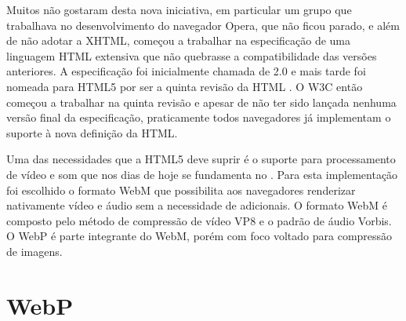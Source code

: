 \documentclass[espaco=simples,appendix=Name]{abnt}
\begin{document}
\begin{description}
Muitos não gostaram desta nova iniciativa, em particular um grupo que trabalhava no desenvolvimento do navegador Opera, que não ficou parado, e além de não adotar a XHTML, começou a trabalhar na especificação de uma linguagem HTML extensiva que não quebrasse a compatibilidade das versões anteriores.  A especificação foi inicialmente chamada de  2.0 e mais tarde foi nomeada para HTML5 por ser a quinta revisão da HTML \cite{HTML5Intro}. O W3C então começou a trabalhar na quinta revisão e apesar de não ter sido lançada nenhuma versão final da especificação, praticamente todos navegadores já implementam o suporte à nova definição da HTML.

Uma das necessidades que a HTML5 deve suprir é o suporte para processamento de vídeo e som que nos dias de hoje se fundamenta no . Para esta implementação foi escolhido o formato WebM que possibilita aos navegadores renderizar nativamente vídeo e áudio sem a necessidade de  adicionais. O formato WebM é composto pelo método de compressão de vídeo VP8 e o padrão de áudio Vorbis. O WebP é parte integrante do WebM, porém com foco voltado para compressão de imagens.

\end{description}

\chapter{WebP}
\end{document}
